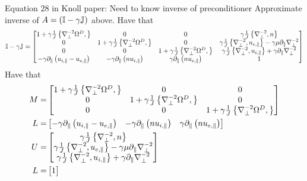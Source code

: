 Equation $28$ in Knoll paper: Need to know inverse of preconditioner
Approximate inverse of
$A=\left( \mathbb{I} - \gamma\mathbb{J}\right)$ above.
Have that
\begin{align*}
\mathbb{I} - \gamma\mathbb{J} =
    \begin{bmatrix}
        1+\gamma\frac{1}{J}\left\{\nabla_\perp^{-2}\Omega^D,\right\}
        & 0
        & 0
        & \gamma\frac{1}{J}\left\{\nabla_\perp^{-2},n\right\}
        \\
        0
        &1+ \gamma\frac{1}{J}\left\{\nabla_\perp^{-2}\Omega^D,\right\}
        & 0
        & \gamma\frac{1}{J}\left\{\nabla_\perp^{-2},u_{e,\|}\right\}
          -\gamma\mu \partial_\| \nabla_\perp^{-2}
        \\
        0
        & 0
        & 1+\gamma\frac{1}{J}\left\{\nabla_\perp^{-2}\Omega^D,\right\}
        & \gamma\frac{1}{J}\left\{\nabla_\perp^{-2},u_{i,\|}\right\}
        + \gamma\partial_\|\nabla_\perp^{-2}
        \\
        -\gamma\partial_\| \left(u_{i,\|} - u_{e,\|} \right)
        & -\gamma\partial_\| \left(nu_{i,\|} \right)
        & \gamma\partial_\| \left(nu_{e,\|} \right)
        & 1
    \end{bmatrix}
\end{align*}
Have that
\begin{align*}
    M =&
    \begin{bmatrix}
        1+\gamma\frac{1}{J}\left\{\nabla_\perp^{-2}\Omega^D,\right\}
        & 0
        & 0
        \\
        0
        &1+ \gamma\frac{1}{J}\left\{\nabla_\perp^{-2}\Omega^D,\right\}
        & 0
        \\
        0
        & 0
        & 1+\gamma\frac{1}{J}\left\{\nabla_\perp^{-2}\Omega^D,\right\}
    \end{bmatrix}
    \\
    L = &
    \begin{bmatrix}
        -\gamma\partial_\| \left(u_{i,\|} - u_{e,\|} \right)
        & -\gamma\partial_\| \left(nu_{i,\|} \right)
        & \gamma\partial_\| \left(nu_{e,\|} \right)
    \end{bmatrix}
    \\
    U =&
    \begin{bmatrix}
        \gamma\frac{1}{J}\left\{\nabla_\perp^{-2},n\right\}
        \\
        \gamma\frac{1}{J}\left\{\nabla_\perp^{-2},u_{e,\|}\right\}
          -\gamma\mu \partial_\| \nabla_\perp^{-2}
        \\
        \gamma\frac{1}{J}\left\{\nabla_\perp^{-2},u_{i,\|}\right\}
        + \gamma\partial_\|\nabla_\perp^{-2}
    \end{bmatrix}
    \\
    L = &
    \begin{bmatrix}
        1
    \end{bmatrix}
\end{align*}
